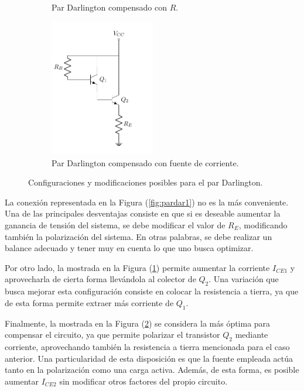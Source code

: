 \begin{figure}[H]
\begin{subfigure}{.4\textwidth}
	\caption{Par Darlington compensado con $R$.}
	\label{fig:pardar2}
\end{subfigure}
\begin{subfigure}{.5\textwidth}
\centering
	\includegraphics[width=0.5\textwidth, page=3]{Imagenes/ParDarlington.pdf}
	\caption{Par Darlington compensado con fuente de corriente.}
	\label{fig:pardar3}
\end{subfigure}
\caption{Configuraciones y modificaciones posibles para el par Darlington.}
\label{fig:pardar}
\end{figure}

La conexión representada en la Figura (\ref{fig:pardar1}) no es la más conveniente. Una de las principales desventajas consiste en que si es deseable aumentar la ganancia de tensión del sistema, se debe modificar el valor de $R_E$, modificando también la polarización del sistema. En otras palabras, se debe realizar un balance adecuado y tener muy en cuenta lo que uno busca optimizar.

Por otro lado, la mostrada en la Figura (\ref{fig:pardar2}) permite aumentar la corriente $I_{CE1}$ y aprovecharla de cierta forma llevándola al colector de $Q_2$. Una variación que busca mejorar esta configuración consiste en colocar la resistencia a tierra, ya que de esta forma permite extraer más corriente de $Q_1$.

Finalmente, la mostrada en la Figura (\ref{fig:pardar3}) se considera la más óptima para compensar el circuito, ya que permite polarizar el transistor $Q_2$ mediante corriente, aprovechando también la resistencia a tierra mencionada para el caso anterior. Una particularidad de esta disposición es que la fuente empleada actúa tanto en la polarización como una carga activa. Además, de esta forma, es posible aumentar $I_{CE2}$ sin modificar otros factores del propio circuito.

